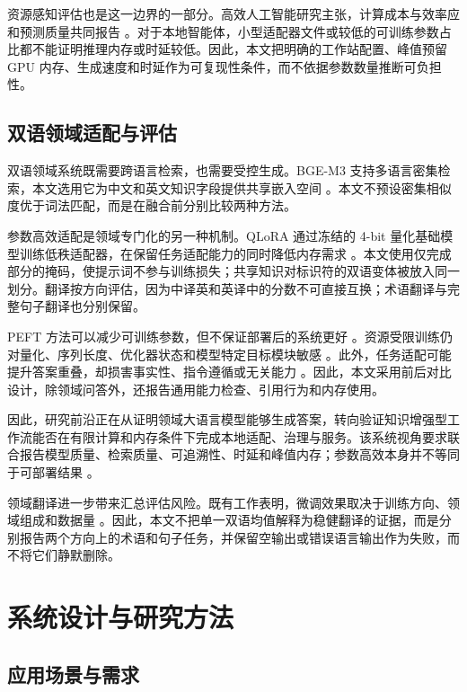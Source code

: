 资源感知评估也是这一边界的一部分。高效人工智能研究主张，计算成本与效率应和预测质量共同报告 \citep{schwartz2020green}。对于本地智能体，小型适配器文件或较低的可训练参数占比都不能证明推理内存或时延较低。因此，本文把明确的工作站配置、峰值预留 GPU 内存、生成速度和时延作为可复现性条件，而不依据参数数量推断可负担性。

\subsection{双语领域适配与评估}

双语领域系统既需要跨语言检索，也需要受控生成。BGE-M3 支持多语言密集检索，本文选用它为中文和英文知识字段提供共享嵌入空间 \citep{chen2024bgem3}。本文不预设密集相似度优于词法匹配，而是在融合前分别比较两种方法。

参数高效适配是领域专门化的另一种机制。QLoRA 通过冻结的 4-bit 量化基础模型训练低秩适配器，在保留任务适配能力的同时降低内存需求 \citep{dettmers2023qlora}。本文使用仅完成部分的掩码，使提示词不参与训练损失；共享知识对标识符的双语变体被放入同一划分。翻译按方向评估，因为中译英和英译中的分数不可直接互换；术语翻译与完整句子翻译也分别保留。

PEFT 方法可以减少可训练参数，但不保证部署后的系统更好 \citep{ding2023peft,wang2025peft}。资源受限训练仍对量化、序列长度、优化器状态和模型特定目标模块敏感 \citep{lv2024full}。此外，任务适配可能提升答案重叠，却损害事实性、指令遵循或无关能力 \citep{tian2024factuality,barnett2024finetuning}。因此，本文采用前后对比设计，除领域问答外，还报告通用能力检查、引用行为和内存使用。

因此，研究前沿正在从证明领域大语言模型能够生成答案，转向验证知识增强型工作流能否在有限计算和内存条件下完成本地适配、治理与服务。该系统视角要求联合报告模型质量、检索质量、可追溯性、时延和峰值内存；参数高效本身并不等同于可部署结果 \citep{ding2023peft,lv2024full,wang2025peft}。

领域翻译进一步带来汇总评估风险。既有工作表明，微调效果取决于训练方向、领域组成和数据量 \citep{hu2024translation,vieira2024translation,zheng2024translation}。因此，本文不把单一双语均值解释为稳健翻译的证据，而是分别报告两个方向上的术语和句子任务，并保留空输出或错误语言输出作为失败，而不将它们静默删除。

\section{系统设计与研究方法}

\subsection{应用场景与需求}

